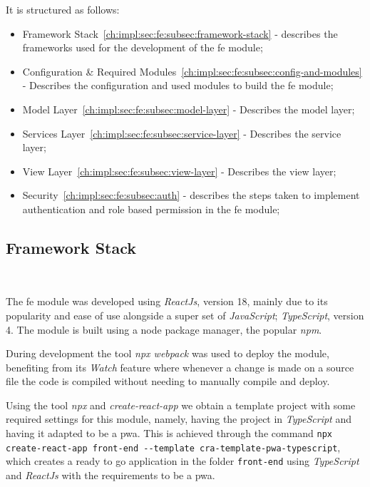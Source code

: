 It is structured as follows:

\begin{itemize}
    \item Framework Stack~\ref{ch:impl:sec:fe:subsec:framework-stack} - describes the frameworks used for the development of the \acrlong{fe} module;
    \item Configuration \& Required Modules~\ref{ch:impl:sec:fe:subsec:config-and-modules} - Describes the configuration and used modules to build the \acrlong{fe} module;
    \item Model Layer~\ref{ch:impl:sec:fe:subsec:model-layer} - Describes the model layer;
    \item Services Layer~\ref{ch:impl:sec:fe:subsec:service-layer} - Describes the service layer;
    \item View Layer~\ref{ch:impl:sec:fe:subsec:view-layer} - Describes the view layer;
    \item Security~\ref{ch:impl:sec:fe:subsec:auth} - describes the steps taken to implement authentication and role based permission in the \acrlong{fe} module;
\end{itemize}


\subsection{Framework Stack}~\label{ch:impl:sec:fe:subsec:framework-stack}

The \acrshort{fe} module was developed using \textit{ReactJs}, version 18, mainly due to its popularity and ease of use alongside a super set of \textit{JavaScript}; \textit{TypeScript}, version 4. The module is built using a node package manager, the popular \textit{npm}. 

During development the tool \textit{npx webpack} was used to deploy the module, benefiting from its \textit{Watch} feature where whenever a change is made on a source file the code is compiled without needing to manually compile and deploy. 


Using the tool \textit{npx} and \textit{create-react-app} we obtain a template project with some required settings for this module, namely, having the project in \textit{TypeScript} and having it adapted to be a \acrshort{pwa}. This is achieved through the command \lstinline[keywordstyle=\color{black},commentstyle=\color{black},stringstyle=\color{black}]{npx create-react-app front-end --template cra-template-pwa-typescript}, which creates a ready to go application in the folder \lstinline[keywordstyle=\color{black},commentstyle=\color{black},stringstyle=\color{black}]{front-end} using \textit{TypeScript} and \textit{ReactJs} with the requirements to be a \acrshort{pwa}.


